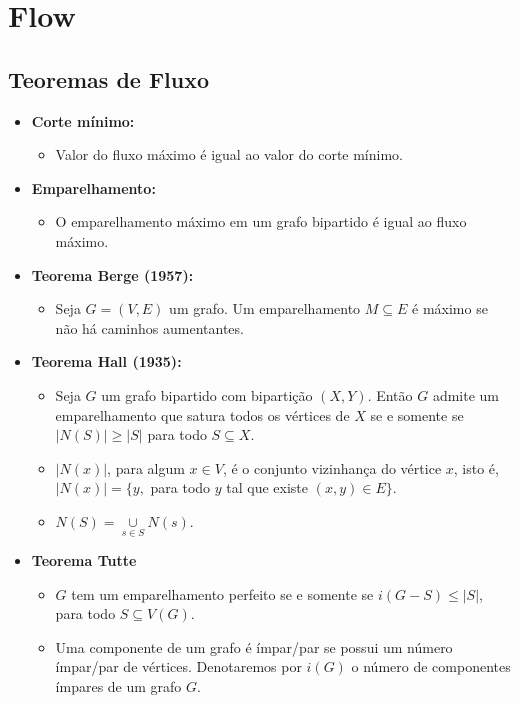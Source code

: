 
    \section{Flow}
    \subsection{Teoremas de Fluxo}
    \begin{itemize}
        \item \textbf{Corte mínimo:}
        \begin{itemize}
            \item Valor do fluxo máximo é igual ao valor do corte mínimo.
        \end{itemize}
        \item \textbf{Emparelhamento:}
        \begin{itemize}
            \item O emparelhamento máximo em um grafo bipartido é igual ao fluxo máximo.
        \end{itemize}
        \item \textbf{Teorema Berge (1957):}
        \begin{itemize}
            \item Seja $G=(V, E)$ um grafo. Um emparelhamento $M \subseteq E$ é máximo se não há caminhos aumentantes.
        \end{itemize}
        \item \textbf{Teorema Hall (1935):}
        \begin{itemize}
            \item Seja $G$ um grafo bipartido com bipartição $(X, Y)$. Então $G$ admite um emparelhamento que satura todos os vértices de $X$ se e somente se $|N(S)| \ge |S|$ para todo $S \subseteq X$.
            \item $|N(x)|$, para algum $x \in V$, é o conjunto vizinhança do vértice $x$, isto é, $|N(x)| = \{y,$ para todo $y$ tal que existe $(x, y)\in E\}$.
            \item $N(S)=\underset{s\in S}{\cup} N(s)$.
        \end{itemize}
        \item \textbf{Teorema Tutte}
        \begin{itemize}
            \item $G$ tem um emparelhamento perfeito se e somente se $i(G-S) \le |S|$, para todo $S \subseteq V(G)$.
            \item Uma componente de um grafo é ímpar/par se possui um número ímpar/par de vértices. Denotaremos por $i(G)$ o número de componentes ímpares de um grafo $G$.

\end{itemize}
\end{itemize}
